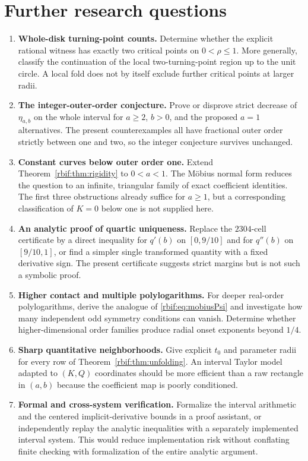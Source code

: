 \documentclass[11pt,a4paper]{article}
\theoremstyle{definition}\newtheorem{definition}[theorem]{Definition}
\theoremstyle{remark}\newtheorem{remark}[theorem]{Remark}
\numberwithin{equation}{section}
\begin{document}
\section{Further research questions}
\label{rbif:sec:future}
\begin{enumerate}[label=\textbf{\arabic*.},leftmargin=*]
\item \textbf{Whole-disk turning-point counts.}
Determine whether the explicit rational witness has exactly two critical
points on $0<\rho\le1$. More generally, classify the continuation of the
local two-turning-point region up to the unit circle. A local fold does
not by itself exclude further critical points at larger radii.
\item \textbf{The integer-outer-order conjecture.}
Prove or disprove strict decrease of $\eta_{a,b}$ on the whole interval
for $a\ge2$, $b>0$, and the proposed $a=1$ alternatives. The present
counterexamples all have fractional outer order strictly between one
and two, so the integer conjecture survives unchanged.
\item \textbf{Constant curves below outer order one.}
Extend Theorem~\ref{rbif:thm:rigidity} to $0<a<1$. The M\"obius normal
form reduces the question to an infinite, triangular family of exact
coefficient identities. The first three obstructions already suffice
for $a\ge1$, but a corresponding classification of $K=0$ below one is
not supplied here.
\item \textbf{An analytic proof of quartic uniqueness.}
Replace the $2304$-cell certificate by a direct inequality for
$q'(b)$ on $[0,9/10]$ and for $q''(b)$ on $[9/10,1]$, or find a simpler
single transformed quantity with a fixed derivative sign. The present
certificate suggests strict margins but is not such a symbolic proof.
\item \textbf{Higher contact and multiple polylogarithms.}
For deeper real-order polylogarithms, derive the analogue of
\eqref{rbif:eq:mobiusPsi} and investigate how many independent odd
symmetry conditions can vanish. Determine whether higher-dimensional
order families produce radial onset exponents beyond $1/4$.
\item \textbf{Sharp quantitative neighborhoods.}
Give explicit $t_0$ and parameter radii for every row of
Theorem~\ref{rbif:thm:unfolding}. An interval Taylor model adapted to
$(K,Q)$ coordinates should be more efficient than a raw rectangle in
$(a,b)$ because the coefficient map is poorly conditioned.
\item \textbf{Formal and cross-system verification.}
Formalize the interval arithmetic and the centered implicit-derivative
bounds in a proof assistant, or independently replay the analytic
inequalities with a separately implemented interval system. This would
reduce implementation risk without conflating finite checking with
formalization of the entire analytic argument.
\end{enumerate}
\end{document}
